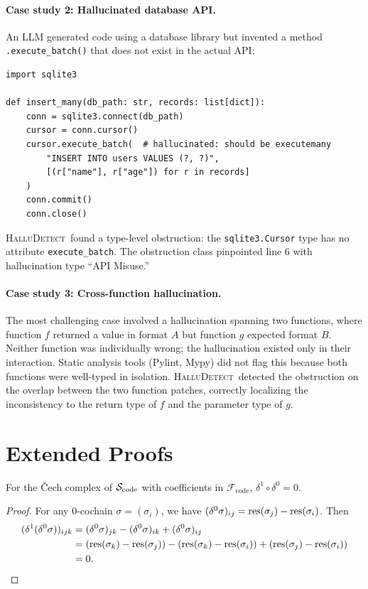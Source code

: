 \documentclass[11pt]{article}
\newcommand{\HalluDetect}{\textsc{HalluDetect}}
\newcommand{\CodeSheaf}{\mathcal{F}_{\mathrm{code}}}
\newcommand{\CodeSite}{\Site_{\mathrm{code}}}
\begin{document}
\paragraph{Case study 2: Hallucinated database API.}
An LLM generated code using a database library but invented a method
\texttt{.execute\_batch()} that does not exist in the actual API:
\begin{lstlisting}
import sqlite3

def insert_many(db_path: str, records: list[dict]):
    conn = sqlite3.connect(db_path)
    cursor = conn.cursor()
    cursor.execute_batch(  # hallucinated: should be executemany
        "INSERT INTO users VALUES (?, ?)",
        [(r["name"], r["age"]) for r in records]
    )
    conn.commit()
    conn.close()
\end{lstlisting}
\HalluDetect\ found a type-level obstruction: the \texttt{sqlite3.Cursor}
type has no attribute \texttt{execute\_batch}.  The obstruction class
pinpointed line 6 with hallucination type ``API Misuse.''

\paragraph{Case study 3: Cross-function hallucination.}
The most challenging case involved a hallucination spanning two
functions, where function $f$ returned a value in format $A$ but
function $g$ expected format $B$.  Neither function was individually
wrong; the hallucination existed only in their interaction.  Static
analysis tools (Pylint, Mypy) did not flag this because both
functions were well-typed in isolation.  \HalluDetect\ detected the
obstruction on the overlap between the two function patches, correctly
localizing the inconsistency to the return type of $f$ and the
parameter type of $g$.


\appendix

\section{Extended Proofs}\label{app:proofs}

\begin{lemma}\label{lem:coboundary}
For the \v{C}ech complex of $\CodeSite$ with coefficients in $\CodeSheaf$,
$\delta^1 \circ \delta^0 = 0$.
\end{lemma}

\begin{proof}
For any 0-cochain $\sigma = (\sigma_i)$, we have
$(\delta^0 \sigma)_{ij} = \mathrm{res}(\sigma_j) - \mathrm{res}(\sigma_i)$.  Then
\begin{align*}
(\delta^1(\delta^0 \sigma))_{ijk}
  &= (\delta^0 \sigma)_{jk} - (\delta^0 \sigma)_{ik} + (\delta^0 \sigma)_{ij} \\
  &= (\mathrm{res}(\sigma_k) - \mathrm{res}(\sigma_j)) - (\mathrm{res}(\sigma_k) - \mathrm{res}(\sigma_i))
     + (\mathrm{res}(\sigma_j) - \mathrm{res}(\sigma_i)) \\
  &= 0. \qedhere
\end{align*}
\end{proof}
\end{document}
